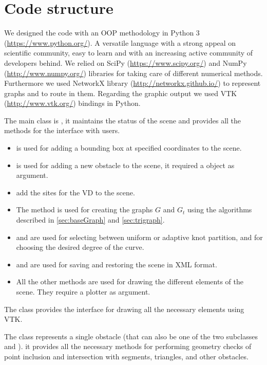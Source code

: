 \documentclass[dissertation.tex]{subfiles}
\begin{document}
\chapter{Code structure}\label{cha:codeStructure}
We designed the code with an \ac{OOP} methodology in Python 3
(\url{https://www.python.org/}). A versatile language with a strong
appeal on
scientific community, easy to learn and with an increasing active
community of developers behind. We
relied on SciPy (\url{https://www.scipy.org/}) and NumPy
(\url{http://www.numpy.org/}) libraries for taking care of
different numerical methods. Furthermore we used NetworkX library
(\url{http://networkx.github.io/}) to represent graphs and
to route in them. Regarding the graphic output we used \ac{VTK}
(\url{http://www.vtk.org/}) bindings in Python.

The main class is , it maintains the status of the
scene and provides all the methods for the interface with users.
\begin{itemize}
\item {} is used for adding a bounding box at specified
  coordinates to the scene.
\item {} is used for adding a new
  obstacle to the scene, it required a  object as
  argument.
\item {} add the sites for the \ac{VD} to the scene.
\item The method  is used for creating the graphs
  $G$ and $G_t$ using the algorithms described in \cref{sec:baseGraph}
  and \cref{sec:trigraph}.
\item {} and  are used for
  selecting between uniform or adaptive knot partition, and for choosing
  the desired degree of the curve.
\item {} and  are used for saving
  and restoring the scene in \acs{XML} format.
\item All the other methods  are used for drawing the
  different elements of the scene. They require a plotter as
  argument.
\end{itemize}

The class  provides the interface for drawing all the
necessary elements using \ac{VTK}.

The class  represents a single obstacle (that can also
be one of the two subclasses  and ). it
provides all the necessary methods for performing geometry checks of
point inclusion and intersection with segments, triangles, and other
obstacles.
\end{document}

